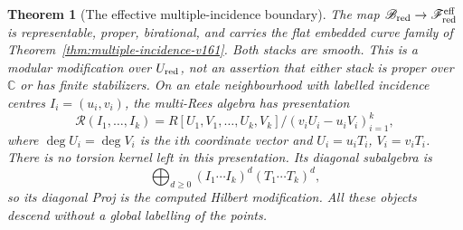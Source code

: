 \documentclass[11pt,reqno]{amsart}
\numberwithin{equation}{section}
\newtheorem{theorem}{Theorem}[section]
\theoremstyle{definition}\newtheorem{definition}[theorem]{Definition}
\theoremstyle{remark}\newtheorem{remark}[theorem]{Remark}
\newcommand{\C}{\mathbb C}\newcommand{\Q}{\mathbb Q}
\begin{document}
\begin{theorem}[The effective multiple-incidence boundary]
\label{thm:boundary-stack-v161}
The map $\mathscr B_{\rm red}\to\mathscr F_{\rm red}^{\rm eff}$
is representable, proper, birational, and carries the flat embedded
curve family of Theorem~\ref{thm:multiple-incidence-v161}. Both stacks
are smooth. This is a modular modification over $U_{\rm red}$, not
an assertion that either stack is proper over $\C$ or has finite
stabilizers. On an etale neighbourhood with labelled incidence
centres $I_i=(u_i,v_i)$, the multi-Rees algebra has presentation
\begin{equation}\label{eq:multi-Rees-v161}
 \mathcal R(I_1,\ldots,I_k)
 =R[U_1,V_1,\ldots,U_k,V_k]/(v_iU_i-u_iV_i)_{i=1}^k,
\end{equation}
where $\deg U_i=\deg V_i$ is the $i$th coordinate vector and
$U_i=u_iT_i$, $V_i=v_iT_i$. There is no torsion kernel left in this
presentation. Its diagonal subalgebra is
\begin{equation}\label{eq:diagonal-Rees-v161}
 \bigoplus_{d\geq0}(I_1\cdots I_k)^d(T_1\cdots T_k)^d,
\end{equation}
so its diagonal Proj is the computed Hilbert modification.
All these objects descend without a global labelling of the points.
\end{theorem}
\end{document}
